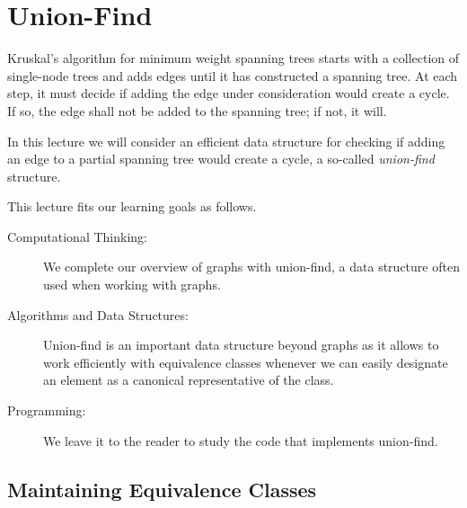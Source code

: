 \chapter{Union-Find}
\label{ch:unionfind}

\newcommand{\lecnum}{26}
\newcommand{\lecturer}{Frank Pfenning, Iliano Cervesato}

\maketitle

\begin{preamble}
\noindent
Kruskal's algorithm for minimum weight spanning trees starts with a
collection of single-node trees and adds edges until it has
constructed a spanning tree.  At each step, it must decide if adding
the edge under consideration would create a cycle.  If so, the edge
shall not be added to the spanning tree; if not, it will.

In this lecture we will consider an efficient data structure for
checking if adding an edge to a partial spanning tree would create a
cycle, a so-called \emph{union-find} structure.
\end{preamble}

\begin{gram}
This lecture fits  our learning goals as follows.
\begin{description}
\item[Computational Thinking: ]%
  We complete our overview of graphs with union-find, a data structure often
  used when working with graphs.
\item[Algorithms and Data Structures: ]%
  Union-find is an important data structure beyond graphs as it allows to work
  efficiently with equivalence classes whenever we can easily designate an
  element as a canonical representative of the class.
\item[Programming: ]%
  We leave it to the reader to study the code that implements union-find.
\end{description}
\end{gram}


\section{Maintaining Equivalence Classes}
\label{sec:unionfind:equiv_classes}

